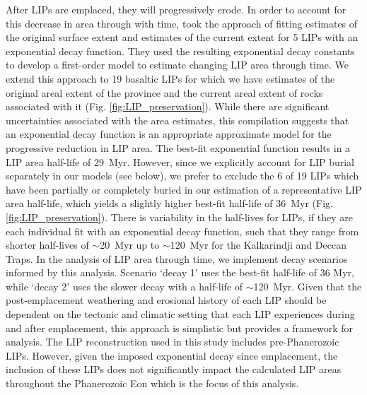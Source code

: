 \documentclass[11pt,letterpaper]{article}
\begin{document}
After LIPs are emplaced, they will progressively erode. In order to account for this decrease in area through with time, \citet{Godderis2017a} took the approach of fitting estimates of the original surface extent and estimates of the current extent for 5 LIPs with an exponential decay function. They used the resulting exponential decay constants to develop a first-order model to estimate changing LIP area through time. We extend this approach to 19 basaltic LIPs for which we have estimates of the original areal extent of the province and the current areal extent of rocks associated with it (Fig. \ref{fig:LIP_preservation}). While there are significant uncertainties associated with the area estimates, this compilation suggests that an exponential decay function is an appropriate approximate model for the progressive reduction in LIP area. The best-fit exponential function results in a LIP area half-life of 29~Myr. However, since we explicitly account for LIP burial separately in our models (see below), we prefer to exclude the 6 of 19 LIPs which have been partially or completely buried in our estimation of a representative LIP area half-life, which yields a slightly higher best-fit half-life of 36~Myr (Fig. \ref{fig:LIP_preservation}). There is variability in the half-lives for LIPs, if they are each individual fit with an exponential decay function, such that they range from shorter half-lives of $\sim$20~Myr up to $\sim$120~Myr for the Kalkarindji and Deccan Traps. In the analysis of LIP area through time, we implement decay scenarios informed by this analysis. Scenario `decay 1' uses the best-fit half-life of 36 Myr, while `decay 2' uses the slower decay with a half-life of $\sim$120~Myr. Given that the post-emplacement weathering and erosional history of each LIP should be dependent on the tectonic and climatic setting that each LIP experiences during and after emplacement, this approach is simplistic but provides a framework for analysis. The LIP reconstruction used in this study includes pre-Phanerozoic LIPs. However, given the imposed exponential decay since emplacement, the inclusion of these LIPs does not significantly impact the calculated LIP areas throughout the Phanerozoic Eon which is the focus of this analysis.
\end{document}
